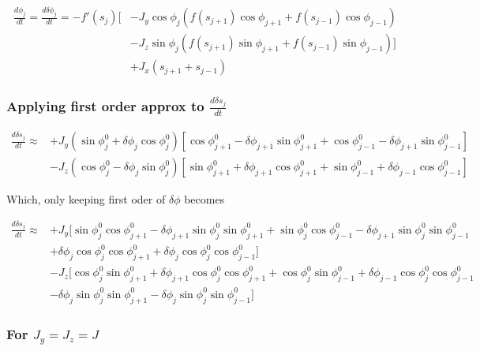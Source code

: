 \documentclass{article}
\begin{document}
\begin{align*}
    \frac{d\phi_j}{dt} = \frac{d\delta\phi_j}{dt}  = -f'(s_j)[&-J_y\cos\phi_j(f(s_{j+1})\cos\phi_{j+1} + f(s_{j-1})\cos\phi_{j-1}) \\
                                  &-J_z\sin\phi_j(f(s_{j+1})\sin\phi_{j+1} + f(s_{j-1})\sin\phi_{j-1})] \\
                                  &+J_x(s_{j+1} + s_{j-1})
\end{align*}

\subsubsection*{Applying first order approx to $\frac{d\delta s_j}{dt}$}

\begin{align*}
    \frac{d\delta s_j}{dt} \approx &+J_y(\sin\phi_j^0 + \delta \phi_j\cos\phi_j^0)[\cos\phi_{j+1}^0 - \delta\phi_{j+1}\sin\phi_{j+1}^0 + \cos\phi_{j-1}^0 - \delta\phi_{j+1}\sin\phi_{j-1}^0] \\
                      &-J_z(\cos\phi_{j}^0 - \delta\phi_{j}\sin\phi_{j}^0)[\sin\phi_{j+1}^0 + \delta \phi_{j+1}\cos\phi_{j+1}^0 + \sin\phi_{j-1}^0 + \delta\phi_{j-1}\cos\phi_{j-1}^0]
\end{align*}

Which, only keeping first oder of $\delta\phi$ becomes

\begin{align*}
    \frac{d\delta s_j}{dt} \approx &+J_y[\sin\phi_j^0\cos\phi_{j+1}^0 - \delta\phi_{j+1}\sin\phi_j^0\sin\phi_{j+1}^0 + \sin\phi_j^0\cos\phi_{j-1}^0 - \delta\phi_{j+1}\sin\phi_j^0\sin\phi_{j-1}^0 \\
                      & + \delta \phi_j\cos\phi_j^0\cos\phi_{j+1}^0 + \delta \phi_j\cos\phi_j^0\cos\phi_{j-1}^0] \\
                      &-J_z[\cos\phi_{j}^0\sin\phi_{j+1}^0 + \delta \phi_{j+1}\cos\phi_{j}^0\cos\phi_{j+1}^0 + \cos\phi_{j}^0\sin\phi_{j-1}^0 + \delta\phi_{j-1}\cos\phi_{j}^0\cos\phi_{j-1}^0 \\
                      & - \delta\phi_{j}\sin\phi_{j}^0\sin\phi_{j+1}^0 - \delta\phi_{j}\sin\phi_{j}^0\sin\phi_{j-1}^0] 
                    \end{align*}

\subsubsection{For $J_y = J_z = J$}
\end{document}
